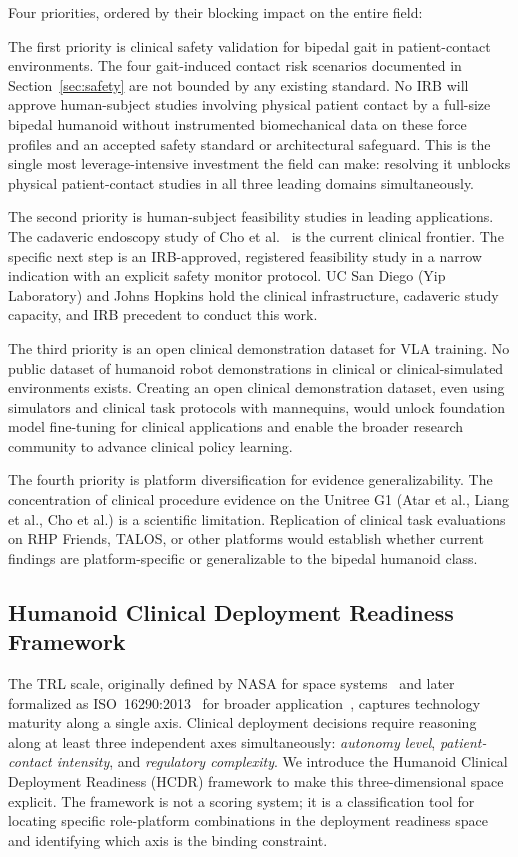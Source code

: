 \documentclass[acmjour]{acmart}
\begin{document}
Four priorities, ordered by their blocking impact on the entire field:

The first priority is clinical safety validation for bipedal gait in
patient-contact environments. The four gait-induced contact risk scenarios documented in
Section~\ref{sec:safety} are not bounded by any existing standard. No IRB will
approve human-subject studies involving physical patient contact by a full-size
bipedal humanoid without instrumented biomechanical data on these force profiles
and an accepted safety standard or architectural safeguard. This is the single
most leverage-intensive investment the field can make: resolving it unblocks
physical patient-contact studies in all three leading domains simultaneously.

The second priority is human-subject feasibility studies in leading applications.
The cadaveric endoscopy study of Cho et al.~\cite{cho2026humanoid} is the current
clinical frontier. The specific next step is an IRB-approved, registered
feasibility study in a narrow indication with an explicit safety monitor protocol.
UC San Diego (Yip Laboratory) and Johns Hopkins hold the clinical
infrastructure, cadaveric study capacity, and IRB precedent to conduct this work.

The third priority is an open clinical demonstration dataset for VLA training.
No public dataset of humanoid robot demonstrations in clinical or
clinical-simulated environments exists. Creating an open clinical demonstration
dataset, even using simulators and clinical task protocols with mannequins, would
unlock foundation model fine-tuning for clinical applications and enable the
broader research community to advance clinical policy learning.

The fourth priority is platform diversification for evidence generalizability.
The concentration of clinical procedure evidence on the Unitree G1 (Atar et al., Liang et al., Cho et al.) is a
scientific limitation. Replication of clinical task evaluations on RHP Friends,
TALOS, or other platforms would establish whether current findings are
platform-specific or generalizable to the bipedal humanoid class.

\subsection{Humanoid Clinical Deployment Readiness Framework}
\label{sec:hcdr}

The TRL scale, originally defined by NASA for space systems~\cite{mankins1995trl}
and later formalized as ISO~16290:2013~\cite{iso16290} for broader
application~\cite{heder2017trl}, captures technology maturity along a single
axis. Clinical deployment decisions require reasoning along at least three
independent axes simultaneously: \emph{autonomy level}, \emph{patient-contact intensity}, and
\emph{regulatory complexity}. We introduce the Humanoid Clinical Deployment
Readiness (HCDR) framework to make this three-dimensional space explicit. The
framework is not a scoring system; it is a classification tool for locating
specific role-platform combinations in the deployment readiness space and
identifying which axis is the binding constraint.
\end{document}
